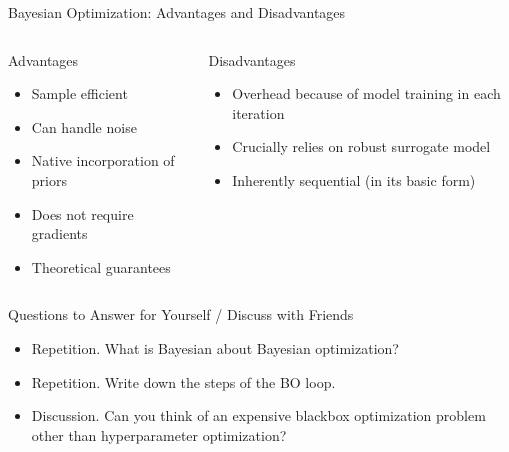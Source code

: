 \begin{frame}[c]{Bayesian Optimization: Advantages and Disadvantages}

\begin{columns}[T] %
\begin{column}{.48\textwidth}


\begin{block}{Advantages}
\begin{itemize}
  \item Sample efficient 
  \item Can handle noise
  \item Native incorporation of priors 
  \item Does not require gradients 
  \item Theoretical guarantees
\end{itemize}
\end{block}

\end{column}%

\hfill%
\pause 
\begin{column}{.48\textwidth}

\begin{block}{Disadvantages}
\begin{itemize}
  \item Overhead because of model training in each iteration 
  \item Crucially relies on robust surrogate model
  \item Inherently sequential (in its basic form)
\end{itemize}
\end{block}

\end{column}
\end{columns}

\end{frame}

\begin{frame}[c]{Questions to Answer for Yourself / Discuss with Friends}

\begin{itemize}
    \item \alert{Repetition.} What is Bayesian about Bayesian optimization?
\medskip
    \item \alert{Repetition.} Write down the steps of the BO loop.
\medskip
    \item \alert{Discussion.} Can you think of an expensive blackbox optimization problem other than hyperparameter optimization?
\end{itemize}

\end{frame}

